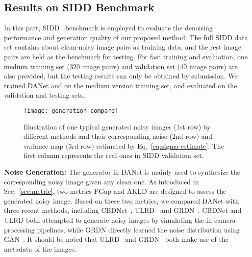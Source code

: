 \documentclass[runningheads]{llncs}
\begin{document}
\subsection{Results on SIDD Benchmark} \label{sec:SIDD}
In this part, SIDD~\cite{SIDD_2018_CVPR} benchmark
is employed
to evaluate the denoising performance and generation quality of our proposed method. The full SIDD data set contains
about  clean-noisy image pairs as training data, and the rest  image pairs are held as the benchmark
for testing. For fast training and evaluation, one medium training set (320 image pairs) and validation
set (40 image pairs) are also provided, but the testing results can only be obtained by 
submission. We trained DANet and  on the medium version training set,
and evaluated on the validation and testing sets.

\begin{figure}[t]
    \centering
    \texttt{[image: generation-compare]}
    \vspace{-7mm}
    \caption{Illustration of one typical generated noisy images (1st row) by different methods and their corresponding
        noise (2nd row) and variance map (3rd row) estimated by Eq.~\eqref{eq:sigma-estimate}. The first
        column represents the real ones in SIDD validation set.
} \label{fig:generation-compare}
\end{figure}
\vspace{2mm}\noindent\textbf{Noise Generation:} 
The generator  in DANet is mainly used to synthesize the corresponding noisy image given any
clean one. As introduced in Sec.~\ref{sec:metric},
two metrics PGap and AKLD are designed to assess the generated noisy image.
Based on these two metrics, we compared DANet with three recent methods, including CBDNet~\cite{guo2019toward},
ULRD~\cite{brooks2019unprocessing} and GRDN~\cite{kim2019grdn}. CBDNet and ULRD both attempted to generate noisy
images by simulating the in-camera processing pipelines, while GRDN directly learned the noise distribution
using GAN~\cite{goodfellow2014generative}. It should be noted that ULRD~\cite{brooks2019unprocessing} and
GRDN~\cite{kim2019grdn} both make use of the metadata of the images.
\end{document}
